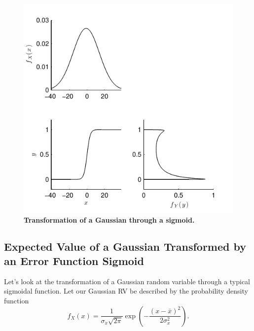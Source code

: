 \documentclass[]{article}
\begin{document}
\begin{figure}[!ht]
	\centering
		\includegraphics[scale=1]{./Figures/pdf/Mapping2.pdf}
	\caption{\textbf{Transformation of a Gaussian through a sigmoid.}}
	\label{fig:label}
\end{figure}

\subsection{Expected Value of a Gaussian Transformed by an Error Function Sigmoid}
Let's look at the transformation of a Gaussian random variable through a typical sigmoidal function. Let our Gaussian RV be described by the probability density function
\begin{equation}\label{eq:Gaussian_pdf}
	f_X(x) = \frac{1}{\sigma_x\sqrt{2\pi}}\exp\left(-\frac{(x-\bar{x})^2}{2\sigma_x^2}\right).
\end{equation}
\end{document}
